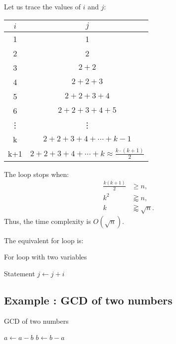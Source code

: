 \documentclass{article}
\begin{document}
Let us trace the values of $i$ and $j$:
\begin{table}[H]
    \centering
    \begin{tabular}{|c|c|}
        \hline
        $i$ & $j$\\
        \hline
        1 & 1\\
        2 & 2\\
        3 & $2+2$\\
        4 & $2+2+3$\\
        5 & $2+2+3+4$\\
        6 & $2+2+3+4+5$\\
        \vdots & \vdots\\
        k & $2+2+3+4+\cdots + k-1$\\
        k+1 & $2+2+3+4+\cdots + k \approx \frac{k \cdot {(k+1)} }{2}$\\
        \hline
    \end{tabular}
\end{table}

The loop stops when:
\[
\begin{aligned}
    \frac{k(k+1)}{2} &\geq n, \\
    k^2 &\gtrapprox n, \\
    k &\gtrapprox \sqrt{n}.
\end{aligned}
\]
Thus, the time complexity is $O(\sqrt{n})$.

The equivalent for loop is:
\begin{algorithm}[H]
    \caption{For loop with two variables}\label{twovar_for}
    \begin{algorithmic}
            \State Statement
            \State $j \gets j+i$
        \EndFor
    \end{algorithmic}
\end{algorithm}

\subsection{Example : GCD of two numbers}
\begin{algorithm}[H]
    \caption{GCD of two numbers}\label{gcd}
    \begin{algorithmic}
                \State $a \gets a - b$
            \Else
                \State $b \gets b - a$
            \EndIf
        \EndWhile
    \end{algorithmic}
\end{algorithm}
\end{document}
